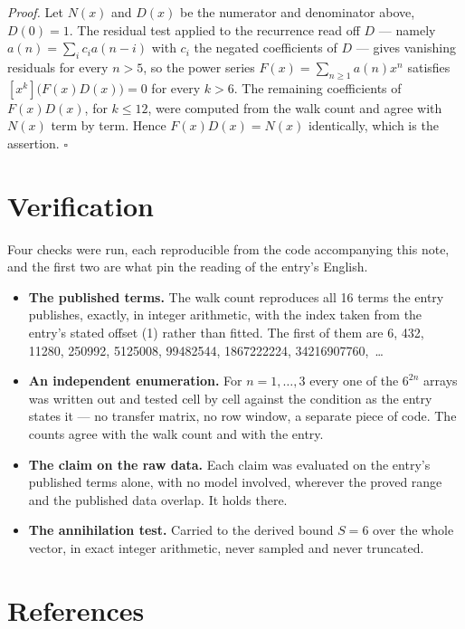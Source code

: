 \documentclass[11pt]{article}
\theoremstyle{definition}
\begin{document}
{\itshape Proof.} Let $N(x)$ and $D(x)$ be the numerator and denominator above, $D(0)=1$. The residual test applied to the recurrence read off $D$ --- namely $a(n) = \sum_i c_i a(n-i)$ with $c_i$ the negated coefficients of $D$ --- gives vanishing residuals for every $n > 5$, so the power series $F(x)=\sum_{n\ge 1}a(n)x^n$ satisfies $[x^k]\bigl(F(x)D(x)\bigr) = 0$ for every $k > 6$. The remaining coefficients of $F(x)D(x)$, for $k \le 12$, were computed from the walk count and agree with $N(x)$ term by term. Hence $F(x)D(x) = N(x)$ identically, which is the assertion. $\square$

\section{Verification}

Four checks were run, each reproducible from the code accompanying this note, and the first two are what pin the reading of the entry's English.

\begin{itemize}

\item {\bfseries The published terms.} The walk count reproduces all 16 terms the entry publishes, exactly, in integer arithmetic, with the index taken from the entry's stated offset (1) rather than fitted. The first of them are 6, 432, 11280, 250992, 5125008, 99482544, 1867222224, 34216907760,~\dots

\item {\bfseries An independent enumeration.} For $n = 1,\dots,3$ every one of the $6^{2n}$ arrays was written out and tested cell by cell against the condition as the entry states it --- no transfer matrix, no row window, a separate piece of code. The counts agree with the walk count and with the entry.

\item {\bfseries The claim on the raw data.} Each claim was evaluated on the entry's published terms alone, with no model involved, wherever the proved range and the published data overlap. It holds there.

\item {\bfseries The annihilation test.} Carried to the derived bound $S = 6$ over the whole vector, in exact integer arithmetic, never sampled and never truncated.

\end{itemize}

\section{References}
\end{document}
